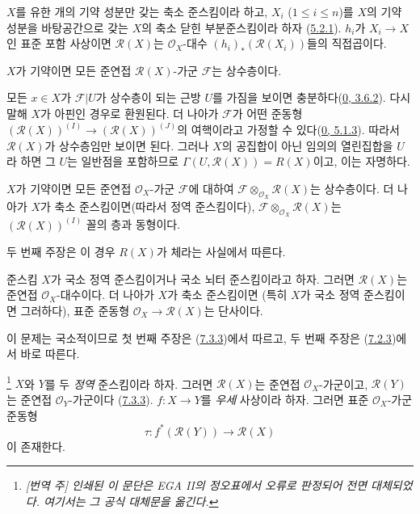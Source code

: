 \begin{corollary}[7.3.4]
\label{I.7.3.4-ko}
$X$를 유한 개의 기약 성분만 갖는 축소 준스킴이라 하고,
$X_i$ ($1\leq i\leq n$)를 $X$의 기약 성분을 바탕공간으로 갖는
$X$의 축소 닫힌 부분준스킴이라 하자
(\hyperref[I.5.2.1-ko]{5.2.1}). $h_i$가 $X_i\to X$인 표준 포함
사상이면 $\mathscr{R}(X)$는 $\mathscr{O}_X$-대수
$(h_i)_*(\mathscr{R}(X_i))$들의 직접곱이다.
\end{corollary}

\begin{corollary}[7.3.5]
\label{I.7.3.5-ko}
$X$가 기약이면 모든 준연접 $\mathscr{R}(X)$-가군
$\mathscr{F}$는 상수층이다.
\end{corollary}

모든 $x\in X$가 $\mathscr{F}|U$가 상수층이 되는 근방 $U$를
가짐을 보이면 충분하다(\hyperref[0.3.6.2-ko]{0, 3.6.2}).
다시 말해 $X$가 아핀인 경우로 환원된다. 더 나아가
$\mathscr{F}$가 어떤 준동형
$(\mathscr{R}(X))^{(I)}\to(\mathscr{R}(X))^{(J)}$의 여핵이라고
가정할 수 있다(\hyperref[0.5.1.3-ko]{0, 5.1.3}). 따라서
$\mathscr{R}(X)$가 상수층임만 보이면 된다. 그러나 $X$의 공집합이
아닌 임의의 열린집합을 $U$라 하면 그 $U$는 일반점을 포함하므로
$\Gamma(U,\mathscr{R}(X))=R(X)$이고, 이는 자명하다.

\begin{corollary}[7.3.6]
\label{I.7.3.6-ko}
$X$가 기약이면 모든 준연접 $\mathscr{O}_X$-가군
$\mathscr{F}$에 대하여
$\mathscr{F}\otimes_{\mathscr{O}_X}\mathscr{R}(X)$는 상수층이다.
더 나아가 $X$가 축소 준스킴이면(따라서 정역 준스킴이다),
$\mathscr{F}\otimes_{\mathscr{O}_X}\mathscr{R}(X)$는
$(\mathscr{R}(X))^{(I)}$ 꼴의 층과 동형이다.
\end{corollary}

두 번째 주장은 이 경우 $R(X)$가 체라는 사실에서 따른다.

\begin{proposition}[7.3.7]
\label{I.7.3.7-ko}
준스킴 $X$가 국소 정역 준스킴이거나 국소
뇌터 준스킴이라고 하자. 그러면 $\mathscr{R}(X)$는 준연접
$\mathscr{O}_X$-대수이다. 더 나아가 $X$가 축소 준스킴이면
(특히 $X$가 국소 정역 준스킴이면 그러하다), 표준 준동형
$\mathscr{O}_X\to\mathscr{R}(X)$는 단사이다.
\end{proposition}

이 문제는 국소적이므로 첫 번째 주장은
(\hyperref[I.7.3.3-ko]{7.3.3})에서 따르고, 두 번째 주장은
(\hyperref[I.7.2.3-ko]{7.2.3})에서 바로 따른다.

\begin{env}[7.3.8]
\label{I.7.3.8-ko}%
\footnote{\emph{[번역 주] 인쇄된 이 문단은 EGA II의 정오표에서
오류로 판정되어 전면 대체되었다. 여기서는 그 공식 대체문을 옮긴다.}}
$X$와 $Y$를 두 \emph{정역} 준스킴이라 하자. 그러면
$\mathscr{R}(X)$는 준연접 $\mathscr{O}_X$-가군이고,
$\mathscr{R}(Y)$는 준연접 $\mathscr{O}_Y$-가군이다
(\hyperref[I.7.3.3-ko]{7.3.3}). $f:X\to Y$를 \emph{우세} 사상이라
하자. 그러면 표준 $\mathscr{O}_X$-가군 준동형
\[
  \tau:f^*(\mathscr{R}(Y))\longrightarrow\mathscr{R}(X)
  \tag{7.3.8.1}\label{I.7.3.8.1-ko}
\]
이 존재한다.
\end{env}

